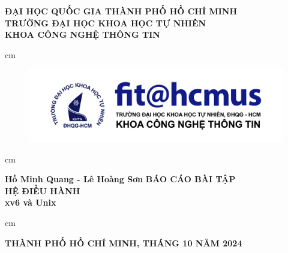 \begin{titlepage}
	\begin{mybox}
		\begin{center}
			\fontsize{12}{12}\selectfont
			\textbf{ĐẠI HỌC QUỐC GIA THÀNH PHỐ HỒ CHÍ MINH}\\
			\textbf{TRƯỜNG ĐẠI HỌC KHOA HỌC TỰ NHIÊN}\\
			\textbf{KHOA CÔNG NGHỆ THÔNG TIN}
		\end{center}
		 cm
		\begin{figure}[H]
			\begin{center}
				\includegraphics[scale=0.5]{figures/fit-logo-chuan-V3}
				\label{fig:fit-logo}
			\end{center}
		\end{figure}
		 cm
		\begin{center}
			\fontsize{16}{12}\selectfont
			\textbf{Hồ Minh Quang - Lê Hoàng Sơn}
			\vskip 0.75cm
			\textbf{BÁO CÁO BÀI TẬP}\\
			\fontsize{24}{20}\selectfont
			\textbf{HỆ ĐIỀU HÀNH}\\
			\fontsize{16}{12}\selectfont
			\textbf{xv6 và Unix}
		\end{center}
		 cm
		\begin{center}
			\textbf{THÀNH PHỐ HỒ CHÍ MINH, THÁNG 10 NĂM 2024}
		\end{center}
	\end{mybox}
	
	\pagebreak
	\thispagestyle{empty}
	

\end{titlepage}

